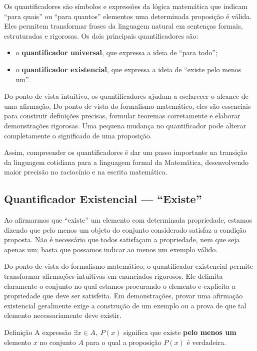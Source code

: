 \documentclass[12pt,a4paper,openright]{book}
\begin{document}
Os quantificadores são símbolos e expressões da lógica matemática que indicam “para quais” ou “para quantos” elementos uma determinada proposição é válida. Eles permitem transformar frases da linguagem natural em sentenças formais, estruturadas e rigorosas. Os dois principais quantificadores são:

\begin{itemize}
    \item o \textbf{quantificador universal}, que expressa a ideia de “para todo”;
    \item o \textbf{quantificador existencial}, que expressa a ideia de “existe pelo menos um”.
\end{itemize}

Do ponto de vista intuitivo, os quantificadores ajudam a esclarecer o alcance de uma afirmação. Do ponto de vista do formalismo matemático, eles são essenciais para construir definições precisas, formular teoremas corretamente e elaborar demonstrações rigorosas. Uma pequena mudança no quantificador pode alterar completamente o significado de uma proposição.

Assim, compreender os quantificadores é dar um passo importante na transição da linguagem cotidiana para a linguagem formal da Matemática, desenvolvendo maior precisão no raciocínio e na escrita matemática.\subsection{Quantificador Existencial — “Existe”}

Ao afirmarmos que “existe” um elemento com determinada propriedade, estamos dizendo que pelo menos um objeto do conjunto considerado satisfaz a condição proposta. Não é necessário que todos satisfaçam a propriedade, nem que seja apenas um; basta que possamos indicar ao menos um exemplo válido.

Do ponto de vista do formalismo matemático, o quantificador existencial permite transformar afirmações intuitivas em enunciados rigorosos. Ele delimita claramente o conjunto no qual estamos procurando o elemento e explicita a propriedade que deve ser satisfeita. Em demonstrações, provar uma afirmação existencial geralmente exige a construção de um exemplo ou a prova de que tal elemento necessariamente deve existir.

\begin{block}{Definição}
A expressão \(\exists x \in A,\; P(x)\) significa que existe \textbf{pelo menos um} elemento \(x\) no conjunto \(A\) para o qual a proposição \(P(x)\) é verdadeira.
\end{block}
\end{document}

